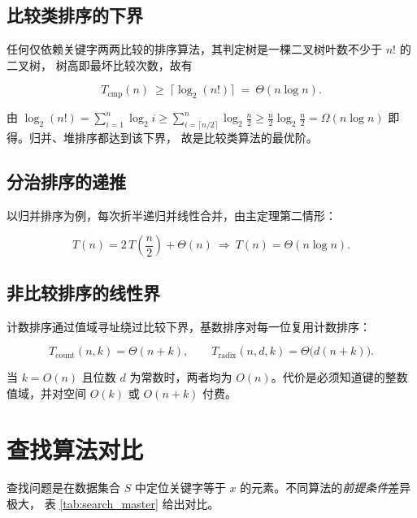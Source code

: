 \subsection{比较类排序的下界}

任何仅依赖关键字两两比较的排序算法，其判定树是一棵二叉树叶数不少于 $n!$ 的二叉树，
树高即最坏比较次数，故有

\begin{equation}
T_{\mathrm{cmp}}(n)\ \ge\ \lceil \log_2(n!)\rceil\ =\ \Theta(n\log n).
\label{eq:cmp_lower}
\end{equation}

由 $\log_2(n!)=\sum_{i=1}^{n}\log_2 i\ge\sum_{i=\lceil n/2\rceil}^{n}\log_2\frac{n}{2}
\ge\frac{n}{2}\log_2\frac{n}{2}=\Omega(n\log n)$ 即得。归并、堆排序都达到该下界，
故是比较类算法的最优阶。

\subsection{分治排序的递推}

以归并排序为例，每次折半递归并线性合并，由主定理第二情形：

\begin{equation}
T(n)=2\,T\!\left(\frac{n}{2}\right)+\Theta(n)\ \Longrightarrow\ T(n)=\Theta(n\log n).
\label{eq:merge_rec}
\end{equation}

\subsection{非比较排序的线性界}

计数排序通过值域寻址绕过比较下界，基数排序对每一位复用计数排序：

\begin{equation}
T_{\mathrm{count}}(n,k)=\Theta(n+k),\qquad
T_{\mathrm{radix}}(n,d,k)=\Theta\bigl(d(n+k)\bigr).
\label{eq:linear_sort}
\end{equation}

当 $k=O(n)$ 且位数 $d$ 为常数时，两者均为 $O(n)$。代价是必须知道键的整数值域，并对空间
$O(k)$ 或 $O(n+k)$ 付费。

\section{查找算法对比}

查找问题是在数据集合 $S$ 中定位关键字等于 $x$ 的元素。不同算法的\emph{前提条件}差异极大，
表 \ref{tab:search_master} 给出对比。


